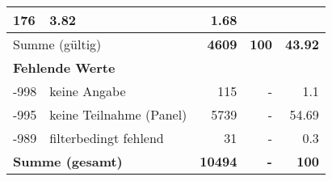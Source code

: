 \begin{longtable}{lXrrr}
       \num{176} &
       \num[round-mode=places,round-precision=2]{3,82} &
         \num[round-mode=places,round-precision=2]{1,68} \\
     \midrule
     \multicolumn{2}{l}{Summe (gültig)} &
       \textbf{\num{4609}} &
     \textbf{100} &
       \textbf{\num[round-mode=places,round-precision=2]{43,92}} \\
     \multicolumn{5}{l}{\textbf{Fehlende Werte}}\\
       -998 &
       keine Angabe &
         \num{115} &
        - &
         \num[round-mode=places,round-precision=2]{1,1} \\
       -995 &
       keine Teilnahme (Panel) &
         \num{5739} &
        - &
         \num[round-mode=places,round-precision=2]{54,69} \\
       -989 &
       filterbedingt fehlend &
         \num{31} &
        - &
         \num[round-mode=places,round-precision=2]{0,3} \\
     \midrule
     \multicolumn{2}{l}{\textbf{Summe (gesamt)}} &
          \textbf{\num{10494}} &
        \textbf{-} &
        \textbf{100} \\
     \bottomrule
     \end{longtable}
     
